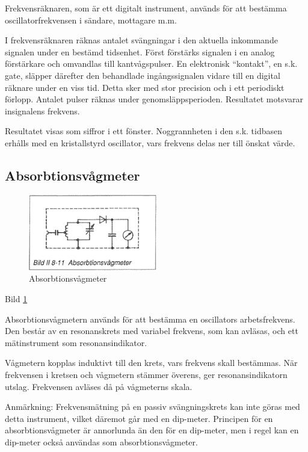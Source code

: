 Frekvensräknaren, som är ett digitalt instrument, används för att
bestämma oscillatorfrekvensen i sändare, mottagare m.m.

I frekvensräknaren räknas antalet svängningar i den aktuella
inkommande signalen under en bestämd tidsenhet. Först förstärks
signalen i en analog förstärkare och omvandlas till kantvågspulser. En
elektronisk ``kontakt'', en s.k. gate, släpper därefter den behandlade
ingångssignalen vidare till en digital räknare under en viss
tid. Detta sker med stor precision och i ett periodiskt
förlopp. Antalet pulser räknas under genomsläppsperioden. Resultatet
motsvarar insignalens frekvens.

Resultatet visas som siffror i ett fönster.  Noggrannheten i den
s.k. tidbasen erhålls med en kristallstyrd oscillator, vars frekvens
delas ner till önskat värde.

\begin{rev-raderas}
\subsection{Absorbtionsvågmeter}

\begin{figure}
  \includegraphics[width=0.5\textwidth]{images/bild_2_8-11}
  \caption{Absorbtionsvågmeter}
  \label{fig:bildII8-11}
\end{figure}

Bild \ref{fig:bildII8-11}

Absorbtionsvågmetern används för att bestämma en oscillators
arbetsfrekvens. Den består av en resonanskrets med variabel frekvens,
som kan avläsas, och ett mätinstrument som resonansindikator.

Vågmetern kopplas induktivt till den krets, vars frekvens skall
bestämmas. När frekvensen i kretsen och vågmetern stämmer överens, ger
resonansindikatorn utslag. Frekvensen avläses då på vågmeterns skala.

Anmärkning: Frekvensmätning på en passiv svängningskrets kan inte
göras med detta instrument, vilket däremot går med en
dip-meter. Principen för en absorbtionsvågmeter är annorlunda än den
för en dip-meter, men i regel kan en dip-meter också användas som
absorbtionsvågmeter.
\end{rev-raderas}

